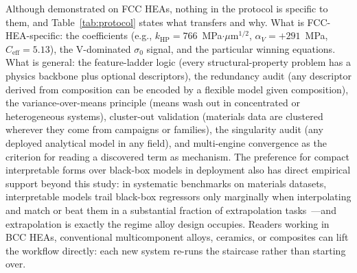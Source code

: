 \documentclass[5p,times,twocolumn]{elsarticle}
\begin{document}
Although demonstrated on FCC HEAs, nothing in the protocol is specific to them, and Table~\ref{tab:protocol} states what transfers and why. What is FCC-HEA-specific: the coefficients (e.g., $k_\text{HP} = 766$~MPa$\cdot\mu$m$^{1/2}$, $\alpha_V = +291$~\si{MPa}, $C_\text{eff} = 5.13$), the V-dominated $\sigma_0$ signal, and the particular winning equations. What is general: the feature-ladder logic (every structural-property problem has a physics backbone plus optional descriptors), the redundancy audit (any descriptor derived from composition can be encoded by a flexible model given composition), the variance-over-means principle (means wash out in concentrated or heterogeneous systems), cluster-out validation (materials data are clustered wherever they come from campaigns or families), the singularity audit (any deployed analytical model in any field), and multi-engine convergence as the criterion for reading a discovered term as mechanism. The preference for compact interpretable forms over black-box models in deployment also has direct empirical support beyond this study: in systematic benchmarks on materials datasets, interpretable models trail black-box regressors only marginally when interpolating and match or beat them in a substantial fraction of extrapolation tasks~\cite{Muckley2023}---and extrapolation is exactly the regime alloy design occupies. Readers working in BCC HEAs, conventional multicomponent alloys, ceramics, or composites can lift the workflow directly: each new system re-runs the staircase rather than starting over.
\end{document}
